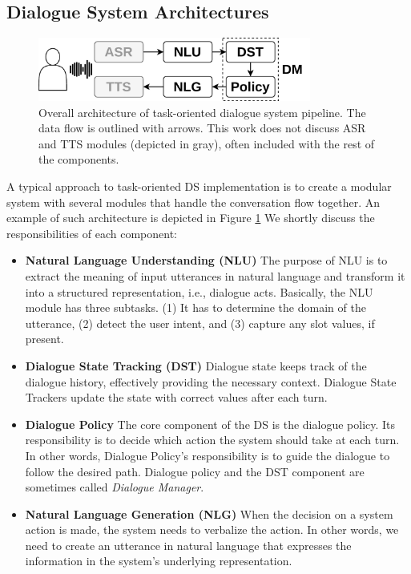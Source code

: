 \subsection{Dialogue System Architectures}
\begin{figure}[t]
    \centering
    \includegraphics[width=0.80\textwidth]{images/pipeline.png}
    \caption{Overall architecture of task-oriented dialogue system pipeline. The data flow is outlined with arrows. This work does not discuss ASR and TTS modules (depicted in gray), often included with the rest of the components.}
    \label{fig:overall}
\end{figure}
A typical approach to task-oriented DS implementation is to create a modular system with several modules that handle the conversation flow together.
An example of such architecture is depicted in Figure \ref{fig:overall}
We shortly discuss the responsibilities of each component:
\begin{itemize}
    \item \textbf{Natural Language Understanding (NLU)} The purpose of NLU is to extract the meaning of input utterances in natural language and transform it into a structured representation, i.e., dialogue acts.
    Basically, the NLU module has three subtasks.
    (1) It has to determine the domain of the utterance, (2) detect the user intent, and (3) capture any slot values, if present.
    \item \textbf{Dialogue State Tracking (DST)} Dialogue state keeps track of the dialogue history, effectively providing the necessary context.
    Dialogue State Trackers update the state with correct values after each turn.
    \item \textbf{Dialogue Policy} The core component of the DS is the dialogue policy.
    Its responsibility is to decide which action the system should take at each turn.
    In other words, Dialogue Policy's responsibility is to guide the dialogue to follow the desired path.
    Dialogue policy and the DST component are sometimes called \emph{Dialogue Manager}.
    \item \textbf{Natural Language Generation (NLG)} When the decision on a system action is made, the system needs to verbalize the action.
    In other words, we need to create an utterance in natural language that expresses the information in the system's underlying representation.
\end{itemize}

